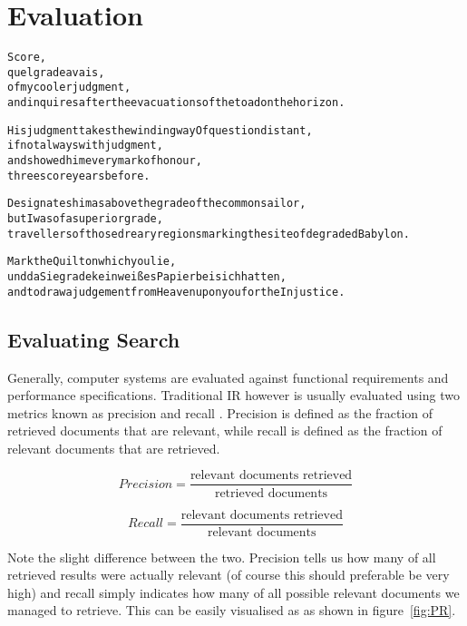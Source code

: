 
\chapter{Evaluation}
\label{ch:evaluation}

\startcontents[chapters]

\vfill

\begin{alltt}\sffamily
Score,
quel grade avais,
of my cooler judgment,
and inquires after the evacuations of the toad on the horizon.

His judgment takes the winding way Of question distant,
if not always with judgment,
and showed him every mark of honour,
three score years before.

Designates him as above the grade of the common sailor,
but I was of a superior grade,
travellers of those dreary regions marking the site of degraded Babylon.

Mark the Quilt on which you lie,
und da Sie grade kein weißes Papier bei sich hatten,
and to draw a judgement from Heaven upon you for the Injustice.
\end{alltt}

\newpage
\minicontents
\spirals

\section{Evaluating Search}
\label{s:evalsearch}

Generally, computer systems are evaluated against functional requirements and performance specifications. Traditional \acf{IR} however is usually evaluated using two metrics known as precision and recall \autocite{Baeza-Yates2011}. Precision is defined as the fraction of retrieved documents that are relevant, while recall is defined as the fraction of relevant documents that are retrieved.

\begin{equation}
  Precision = \frac{\text{relevant documents retrieved}}{\text{retrieved documents}}
  \label{eq:precision}
\end{equation}

\begin{equation}
  Recall = \frac{\text{relevant documents retrieved}}{\text{relevant documents}}
\label{eq:recall}
\end{equation}

Note the slight difference between the two. Precision tells us how many of all retrieved results were actually relevant (of course this should preferable be very high) and recall simply indicates how many of all possible relevant documents we managed to retrieve. This can be easily visualised as as shown in figure~\ref{fig:PR}.

